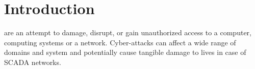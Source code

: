 \documentclass[9pt,journal,compsoc]{IEEEtran}
\begin{document}
%
\IEEEpeerreviewmaketitle



\section{Introduction}
%
%



% 
% 
% 
% 
 are an attempt to damage, disrupt, or gain unauthorized access to a computer, computing systems or a network. Cyber-attacks can affect a wide range of domains and system and potentially cause tangible damage to lives in case of SCADA networks.
\end{document}
